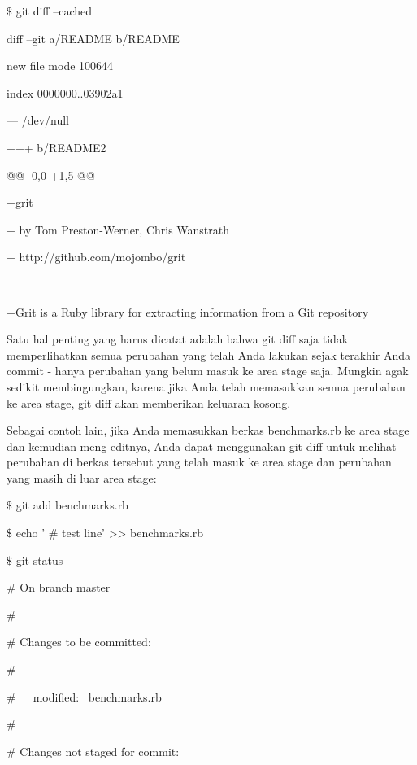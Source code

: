 \vspace{12pt}
\vspace{12pt}
\noindent 
 $  \$  $ git diff --cached \par
\noindent 
diff --git a/README b/README \par
\noindent 
new file mode 100644 \par
\noindent 
index 0000000..03902a1 \par
\noindent 
--- /dev/null \par
\noindent 
+++ b/README2 \par
\noindent 
@@ -0,0 +1,5 @@ \par
\noindent 
+grit \par
\noindent 
+ by Tom Preston-Werner, Chris Wanstrath \par
\noindent 
+ http://github.com/mojombo/grit \par
\noindent 
+ \par
\noindent 
+Grit is a Ruby library for extracting information from a Git repository \par
\noindent 
Satu hal penting yang harus dicatat adalah bahwa git diff saja tidak memperlihatkan semua perubahan yang telah Anda lakukan sejak terakhir Anda commit - hanya perubahan yang belum masuk ke area stage saja. Mungkin agak sedikit membingungkan, karena jika Anda telah memasukkan semua perubahan ke area stage, git diff akan memberikan keluaran kosong. \par
\noindent 
Sebagai contoh lain, jika Anda memasukkan berkas benchmarks.rb ke area stage dan kemudian meng-editnya, Anda dapat menggunakan git diff untuk melihat perubahan di berkas tersebut yang telah masuk ke area stage dan perubahan yang masih di luar area stage: \par
\noindent 
 $  \$  $ git add benchmarks.rb \par
\noindent 
 $  \$  $ echo ' $  \#  $ test line' >> benchmarks.rb \par
\noindent 
 $  \$  $ git status \par
\noindent 
 $  \#  $ On branch master \par
\noindent 
 $  \#  $ \par
\noindent 
 $  \#  $ Changes to be committed: \par
\noindent 
 $  \#  $ \par
\noindent 
 $  \#  $~~~modified:~  benchmarks.rb \par
\noindent 
 $  \#  $ \par
\noindent 
 $  \#  $ Changes not staged for commit: \par
